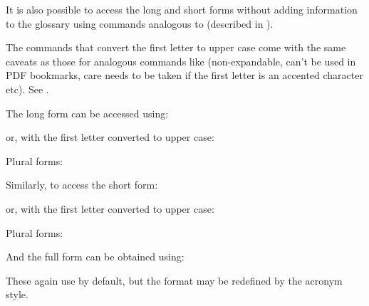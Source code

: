\documentclass[report,inlinetitle]{nlctdoc}
\begin{document}
It is also possible to access the long and short forms without
adding information to the glossary using commands analogous to
 (described in ).

\begin{important}
The commands that convert the first letter to upper case come with
the same caveats as those for analogous commands like
 (non-expandable, can't be used in PDF bookmarks,
care needs to be taken if the first letter is an accented character
etc). See .
\end{important}

The long form can be accessed using:
\begin{definition}[\DescribeMacro{\glsentrylong}]
\end{definition}
or, with the first letter converted to upper case:
\begin{definition}[\DescribeMacro{\Glsentrylong}]
\end{definition}
Plural forms:
\begin{definition}[\DescribeMacro{\glsentrylongpl}]
\end{definition}
\begin{definition}[\DescribeMacro{\Glsentrylongpl}]
\end{definition}

Similarly, to access the short form:
\begin{definition}[\DescribeMacro{\glsentryshort}]
\end{definition}
or, with the first letter converted to upper case:
\begin{definition}[\DescribeMacro{\Glsentryshort}]
\end{definition}
Plural forms:
\begin{definition}[\DescribeMacro{\glsentryshortpl}]
\end{definition}
\begin{definition}[\DescribeMacro{\Glsentryshortpl}]
\end{definition}

And the full form can be obtained using:
\begin{definition}[\DescribeMacro{\glsentryfull}]
\end{definition}
\begin{definition}[\DescribeMacro{\Glsentryfull}]
\end{definition}
\begin{definition}[\DescribeMacro{\glsentryfullpl}]
\end{definition}
\begin{definition}[\DescribeMacro{\Glsentryfullpl}]
\end{definition}
These again use  by default, but
the format may be redefined by the acronym style.
\end{document}
